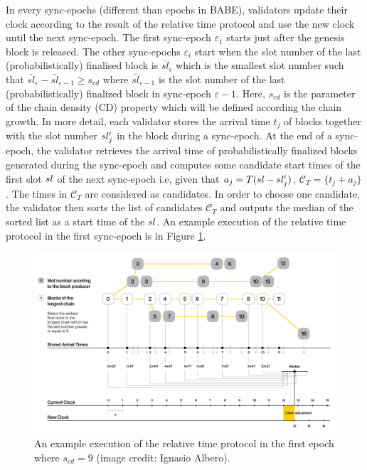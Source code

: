In every sync-epochs (different than epochs in BABE), validators update their clock according to the result of the relative time protocol and use the new clock until the next sync-epoch. The first sync-epoch $\varepsilon_1$ starts just after the genesis block is released. The other sync-epochs  $\varepsilon_i$ start when the slot number of the last (probabilistically) finalised block is $\bar{sl}_{\epsilon}$ which is the smallest slot number such that  $\bar{sl}_{\varepsilon} - \bar{sl}_{\varepsilon-1} \geq s_{cd}$ where $\bar{sl}_{\varepsilon-1}$ is the slot number of the last (probabilistically) finalized block in sync-epoch $\varepsilon-1$. Here, $s_{cd}$ is the parameter of the chain density (CD) property which will be defined according the chain growth.
In more detail, each validator  stores  the arrival time $ t_j $ of  blocks together with the slot number $sl'_j$ in the block during a sync-epoch. At the end of a sync-epoch, the validator retrieves the arrival time of probabilistically finalized blocks generated during the sync-epoch and computes some candidate start times of the first slot $ sl $ of the next sync-epoch i.e,  given that $ a_j = T(sl - sl'_j)  $,  $\mathcal{C}_T = \{t_j+a_j \}$. The times in $ \mathcal{C}_T $ are considered as candidates. In order to  choose one candidate,  the validator then sorts the list of candidates $ \mathcal{C}_T $ and outputs the median of the sorted list as a start time of the $ sl $. An example execution of the relative time protocol in the first sync-epoch is in Figure \ref{fig:relativetime}.

\begin{figure}[h]
	\centering
	\includegraphics[width=1.\textwidth]{images/BABE3.png}
	\caption{An example execution of the relative time protocol in the first epoch where $s_{cd} = 9$ (image credit: Ignasio Albero).}
	\label{fig:relativetime}
\end{figure}
